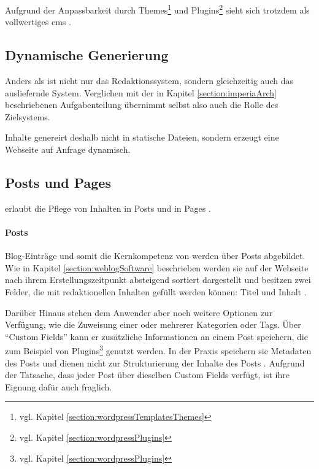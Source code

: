             Aufgrund der Anpassbarkeit durch Themes\footnote{vgl. Kapitel \ref{section:wordpressTemplatesThemes}}
            und Plugins\footnote{vgl. Kapitel \ref{section:wordpressPlugins}} sieht sich
            {\wordpress} trotzdem als vollwertiges \gls{cms}
            \cite{wordpress:About}.

        \subsection{Dynamische Generierung}
            Anders als {\imperia} ist {\wordpress} nicht nur das Redaktionssystem,
            sondern gleichzeitig auch das ausliefernde System.
            Verglichen mit der in Kapitel \ref{section:imperiaArch}
            beschriebenen Aufgabenteilung übernimmt {\wordpress} selbst
            also auch die Rolle des Zielsystems.

            Inhalte genereirt {\wordpress} deshalb nicht in statische Dateien,
            sondern erzeugt eine Webseite auf Anfrage dynamisch.

        \subsection{Posts und Pages}
            \label{section:wordpressPostsPages}
            {\wordpress} erlaubt die Pflege von Inhalten in Posts
            und in Pages \cite{wordpress:Pages}.

            \paragraph*{Posts}
            Blog-Einträge und somit die Kernkompetenz von
            {\wordpress} werden über Posts abgebildet.
            Wie in Kapitel \ref{section:weblogSoftware} beschrieben werden sie
            auf der Webseite nach ihrem Erstellungszeitpunkt absteigend sortiert dargestellt
            und besitzen zwei Felder, die mit redaktionellen Inhalten gefüllt werden können:
            Titel und Inhalt \cite{wordpress:Posts}.
            
            Darüber Hinaus stehen dem Anwender aber noch weitere Optionen zur
            Verfügung, wie die Zuweisung einer oder mehrerer Kategorien oder Tags.
            Über "`Custom Fields"' kann er zusätzliche Informationen an einem Post
            speichern, die zum Beispiel von Plugins\footnote{vgl. Kapitel \ref{section:wordpressPlugins}}
            genutzt werden.
            In der Praxis speichern sie Metadaten des Posts und dienen nicht zur Strukturierung
            der Inhalte des Posts \cite{wordpress:Posts}.
            Aufgrund der Tatsache, dass jeder Post über dieselben Custom Fields verfügt,
            ist ihre Eignung dafür auch fraglich.

